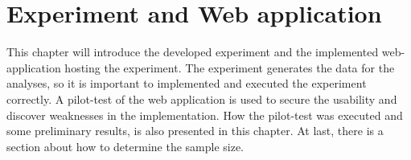 \chapter{Experiment and Web application}
This chapter will introduce the developed experiment and the implemented web-application hosting the experiment. The experiment generates the data for the analyses, so it is important to implemented and executed the experiment correctly. A pilot-test of the web application is used to secure the usability and discover weaknesses in the implementation. How the pilot-test was executed and some preliminary results, is also presented in this chapter. At last, there is a section about how to determine the sample size.  


